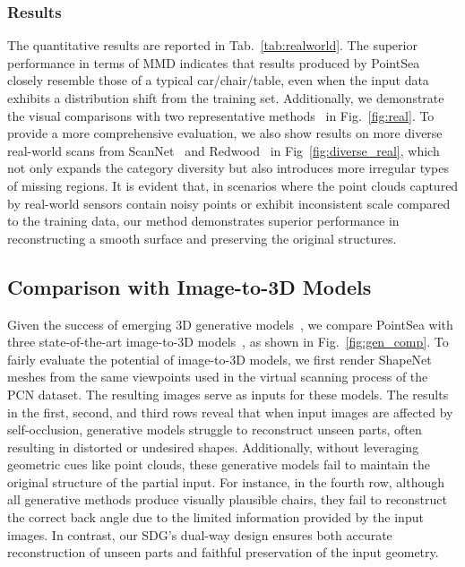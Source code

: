 \subsubsection{Results}
The quantitative results are reported in Tab.~\ref{tab:realworld}. The superior performance in terms of MMD indicates that results produced by PointSea closely resemble those of a typical car/chair/table, even when the input data exhibits a distribution shift from the training set.
Additionally, we demonstrate the visual comparisons with two representative methods~\citep{chen2023anchorformer,10232862} in Fig.~\ref{fig:real}. 
To provide a more comprehensive evaluation, we also show results on more diverse real-world scans from ScanNet~\citep{dai2017scannet} and Redwood~\citep{choi2016large} in Fig~\ref{fig:diverse_real}, which not only expands the category diversity but also introduces more irregular types of missing regions.
It is evident that, in scenarios where the point clouds captured by real-world sensors contain noisy points or exhibit inconsistent scale compared to the training data, our method demonstrates superior performance in reconstructing a smooth surface and preserving the original structures.


\subsection{Comparison with Image-to-3D Models}
Given the success of emerging 3D generative models~\citep{wang2025crm,tang2024dreamgaussian}, we compare PointSea with three state-of-the-art image-to-3D models~\citep{li2024craftsman,sf3d2024,xu2024instantmesh}, as shown in Fig.~\ref{fig:gen_comp}. 
To fairly evaluate the potential of image-to-3D models, we first render ShapeNet meshes from the same viewpoints used in the virtual scanning process of the PCN dataset. The resulting images serve as inputs for these models.
The results in the first, second, and third rows reveal that when input images are affected by self-occlusion, generative models struggle to reconstruct unseen parts, often resulting in distorted or undesired shapes. Additionally, without leveraging geometric cues like point clouds, these generative models fail to maintain the original structure of the partial input. For instance, in the fourth row, although all generative methods produce visually plausible chairs, they fail to reconstruct the correct back angle due to the limited information provided by the input images.
In contrast, our SDG's dual-way design ensures both accurate reconstruction of unseen parts and faithful preservation of the input geometry.


